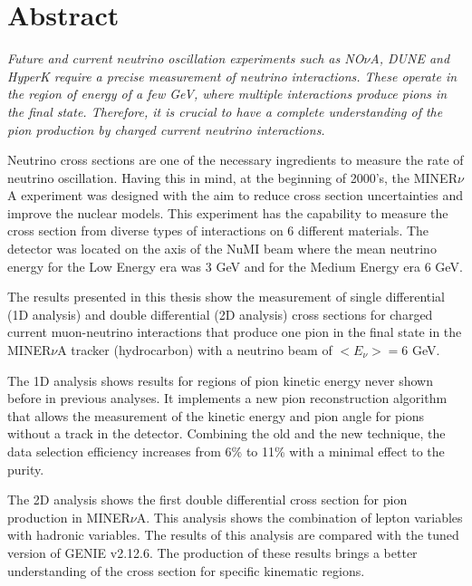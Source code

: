 \section*{Abstract}
\label{Cap:Prlg1}
\it
Future and current neutrino oscillation experiments such as NO$\nu$A\cite{NOvA}, DUNE\cite{DUNE} and HyperK\cite{HyperK} require a precise measurement of neutrino interactions. These operate in the region of energy of a few GeV, where multiple interactions produce pions in the final state. Therefore, it is crucial to have a complete understanding of the pion production by charged current neutrino interactions.


Neutrino cross sections are one of the necessary ingredients to measure the rate of neutrino oscillation. Having this in mind, at the beginning of 2000's, the MINER$\nu$A experiment was designed with the aim to reduce cross section uncertainties and improve the nuclear models. This experiment has the capability to measure the cross section from diverse types of interactions on 6 different materials. The detector was located on the axis of the NuMI beam where the mean neutrino energy for the Low Energy era was 3 GeV and for the Medium Energy era 6 GeV. 

The results presented in this thesis show the measurement of single differential (1D analysis) and double differential (2D analysis) cross sections for charged current muon-neutrino interactions that produce one pion in the final state in the MINER$\nu$A tracker (hydrocarbon) with a neutrino beam of $<E_\nu> = 6$ GeV. 

The 1D analysis shows results for regions of pion kinetic energy never shown before in previous analyses. It implements a new pion reconstruction algorithm that allows the measurement of the kinetic energy and pion angle for pions without a track in the detector. Combining the old and the new technique, the data selection efficiency increases from 6\% to 11\% with a minimal effect to the purity.

The 2D analysis shows the first double differential cross section for pion production in MINER$\nu$A. This analysis shows the combination of lepton variables with hadronic variables. The results of this analysis are compared with the tuned version of GENIE v2.12.6. The production of these results brings a better understanding of the cross section for specific kinematic regions.  



\normalfont

\newpage
